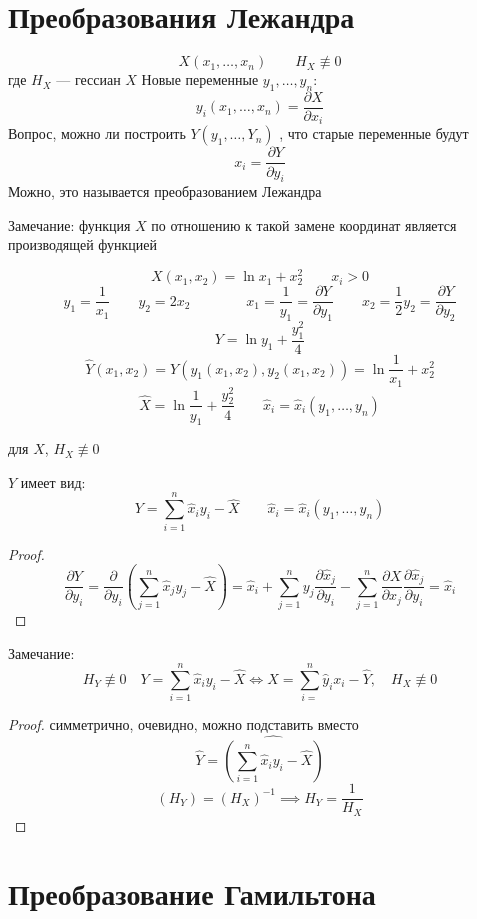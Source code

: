 \documentclass[crop=false]{standalone}
\begin{document}
\section{Преобразования Лежандра}
\[X(x_1, \dots, x_n) \qquad H_X \not \equiv 0\]
где $H_X$ — гессиан $X$
Новые переменные $y_1, \dots, y_n$:
\[y_i(x_1, \dots, x_n) = \frac{\partial X}{\partial x_i}\]
Вопрос, можно ли построить $Y(y_1, \dots, Y_n)$ , что старые переменные будут 
\[x_i = \frac{\partial Y}{\partial y_i}\]
Можно, это называется преобразованием Лежандра

\noindent Замечание: функция $X$ по отношению к такой замене координат является производящей функцией

\noindent \keypoint
\[X(x_1, x_2) = \ln x_1 + x_2^2 \qquad x_i > 0\]
\[y_1 = \frac{1}{x_1} \qquad y_2 = 2 x_2 \qquad \qquad x_1 = \frac{1}{y_1} = \frac{\partial Y}{\partial y_1} \qquad x_2 = \frac{1}{2} y_2 = \frac{\partial Y}{\partial y_2}\]
\[Y = \ln y_1 + \frac{y_1^2}{4}\]
\[\hat Y(x_1, x_2) = Y(y_1(x_1, x_2), y_2(x_1, x_2)) = \ln \frac{1}{x_1} + x_2^2\]
\[\hat X = \ln \frac{1}{y_1} + \frac{y_2^2}{4} \qquad \hat x_i = \hat x_i(y_1, \dots ,y_n)\]

\noindent \keypoint 
для $X$, $H_X \not \equiv 0$

$Y$ имеет вид:
\[Y = \sum_{i=1}^{n} \hat x_i y_i - \hat X \qquad \hat x_i = \hat x_i(y_1, \dots ,y_n)\]
\begin{proof}
    
    \[\frac{\partial Y}{\partial y_i} = \frac{\partial}{\partial y_i} \left( \sum_{j=1}^{n} \hat x_j y_j - \hat X\right) = \hat x_i + \sum_{j=1}^{n} y_j \frac{\partial \hat x_j}{\partial y_i} - \sum_{j=1}^{n} \frac{\partial X}{\partial x_j} \frac{\partial \hat x_j}{\partial y_i} = \hat x_i\]
\end{proof}
Замечание: 
\[H_Y \not \equiv 0 \quad \boxed{Y = \sum_{i=1}^{n} \hat x_i y_i - \hat X} \iff \boxed{X = \sum_{i=}^{n} \hat y_i x_i - \hat Y}, \quad H_X \not \equiv 0\]
    \begin{proof}
    симметрично, очевидно, можно подставить вместо 
    \[\hat Y = \widehat{\left(\sum_{i=1}^{n} \hat x_i y_i - \hat X\right)}\] 
    \[(H_Y) = (H_X)^{-1} \implies H_Y = \frac{1}{H_X}\]
\end{proof}
\section{Преобразование Гамильтона}
\end{document}
